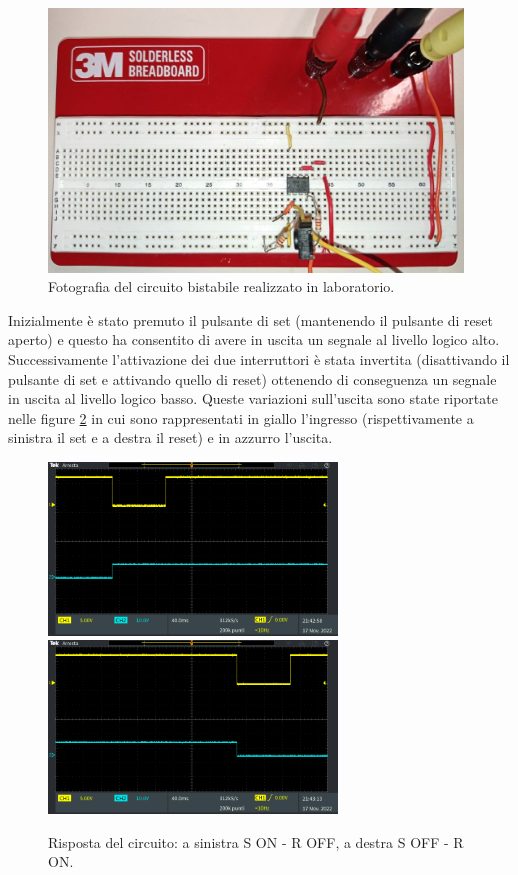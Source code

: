 \documentclass{report}
\begin{document}
\begin{figure}[h!]
	\centering
	\includegraphics[height=7cm]{immagini/circuito2}
	\caption{Fotografia del circuito bistabile realizzato in laboratorio.}
	\label{figura:circuito2}
\end{figure}

\newpage
\noindent Inizialmente è stato premuto il pulsante di set (mantenendo il pulsante di reset aperto) e questo ha consentito di avere in uscita un segnale al livello logico alto. Successivamente l'attivazione dei due interruttori è stata invertita (disattivando il pulsante di set e attivando quello di reset) ottenendo di conseguenza un segnale in uscita al livello logico basso. Queste variazioni sull'uscita sono state riportate nelle figure \ref{figura:TEK00012e13} in cui sono rappresentati in giallo l'ingresso (rispettivamente a sinistra il set e a destra il reset) e in azzurro l'uscita.

\begin{figure}[h!]
	\centering
	\includegraphics[height=4.6cm]{immagini/TEK00016}
	\includegraphics[height=4.6cm]{immagini/TEK00017}
	\caption{Risposta del circuito: a sinistra S ON - R OFF, a destra S OFF - R ON.}
	\label{figura:TEK00012e13}
\end{figure}
\end{document}
